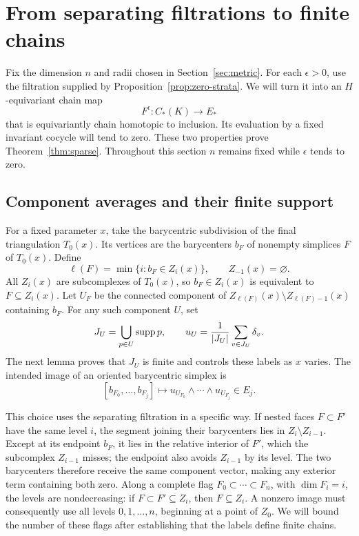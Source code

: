 \section{From separating filtrations to finite chains}\label{sec:chains}

Fix the dimension $n$ and radii chosen in Section~\ref{sec:metric}.
For each $\epsilon>0$, use the filtration supplied by
Proposition~\ref{prop:zero-strata}. We will turn it into an
$H$-equivariant chain map
\[
 F^\epsilon:C_*(K)\longrightarrow E_*
\]
that is equivariantly chain homotopic to inclusion. Its evaluation by
a fixed invariant cocycle will tend to zero. These two properties
prove Theorem~\ref{thm:sparse}. Throughout this section $n$ remains
fixed while $\epsilon$ tends to zero.

\subsection{Component averages and their finite support}

For a fixed parameter $x$, take the barycentric subdivision of the
final triangulation $T_0(x)$. Its vertices are the barycenters $b_F$
of nonempty simplices $F$ of $T_0(x)$. Define
\[
 \ell(F)=\min\{i:b_F\in Z_i(x)\},
 \qquad Z_{-1}(x)=\varnothing.
\]
All $Z_i(x)$ are subcomplexes of $T_0(x)$, so $b_F\in Z_i(x)$
is equivalent to $F\subseteq Z_i(x)$. Let $U_F$ be the connected
component of $Z_{\ell(F)}(x)\setminus Z_{\ell(F)-1}(x)$ containing
$b_F$. For any such component $U$, set
\begin{equation}\label{eq:component-average}
 J_U=\bigcup_{p\in U}\operatorname{supp} p,
 \qquad
 u_U=\frac{1}{|J_U|}\sum_{v\in J_U}\delta_v.
\end{equation}
The next lemma proves that $J_U$ is finite and controls these
labels as $x$ varies.  The intended image of an oriented barycentric
simplex is
\begin{equation}\label{eq:exterior-replacement}
 [b_{F_0},\ldots,b_{F_j}]
 \longmapsto u_{U_{F_0}}\wedge\cdots\wedge u_{U_{F_j}}\in E_j.
\end{equation}

This choice uses the separating filtration in a specific way.
If nested faces $F\subset F'$ have the same level $i$, the segment
joining their barycenters lies in $Z_i\setminus Z_{i-1}$.
Except at its endpoint $b_F$, it lies in the relative interior
of $F'$, which the subcomplex $Z_{i-1}$ misses; the endpoint also
avoids $Z_{i-1}$ by its level.  The two barycenters therefore receive
the same component vector, making any exterior term containing
both zero.  Along a complete flag $F_0\subset\cdots\subset F_n$,
with $\dim F_i=i$, the levels are nondecreasing: if
$F\subset F'\subseteq Z_i$, then $F\subseteq Z_i$.
A nonzero image must consequently use all levels $0,1,\ldots,n$,
beginning at a point of $Z_0$.  We will bound the number of these
flags after establishing that the labels define finite chains.


